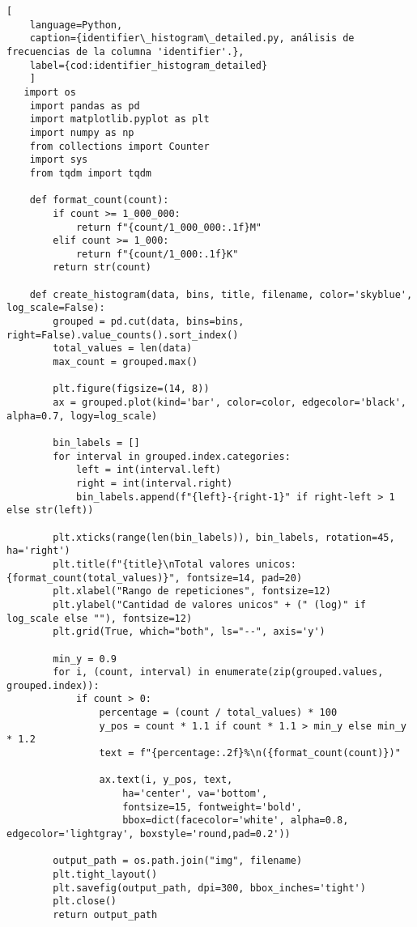 \begin{lstlisting}[
    language=Python,
    caption={identifier\_histogram\_detailed.py, análisis de frecuencias de la columna 'identifier'.},
    label={cod:identifier_histogram_detailed}
    ]
   import os
    import pandas as pd
    import matplotlib.pyplot as plt
    import numpy as np
    from collections import Counter
    import sys
    from tqdm import tqdm

    def format_count(count):
        if count >= 1_000_000:
            return f"{count/1_000_000:.1f}M"
        elif count >= 1_000:
            return f"{count/1_000:.1f}K"
        return str(count)

    def create_histogram(data, bins, title, filename, color='skyblue', log_scale=False):
        grouped = pd.cut(data, bins=bins, right=False).value_counts().sort_index()
        total_values = len(data)
        max_count = grouped.max()
        
        plt.figure(figsize=(14, 8))
        ax = grouped.plot(kind='bar', color=color, edgecolor='black', alpha=0.7, logy=log_scale)
        
        bin_labels = []
        for interval in grouped.index.categories:
            left = int(interval.left)
            right = int(interval.right)
            bin_labels.append(f"{left}-{right-1}" if right-left > 1 else str(left))
        
        plt.xticks(range(len(bin_labels)), bin_labels, rotation=45, ha='right')
        plt.title(f"{title}\nTotal valores unicos: {format_count(total_values)}", fontsize=14, pad=20)
        plt.xlabel("Rango de repeticiones", fontsize=12)
        plt.ylabel("Cantidad de valores unicos" + (" (log)" if log_scale else ""), fontsize=12)
        plt.grid(True, which="both", ls="--", axis='y')
        
        min_y = 0.9
        for i, (count, interval) in enumerate(zip(grouped.values, grouped.index)):
            if count > 0:
                percentage = (count / total_values) * 100
                y_pos = count * 1.1 if count * 1.1 > min_y else min_y * 1.2
                text = f"{percentage:.2f}%\n({format_count(count)})"
                
                ax.text(i, y_pos, text, 
                    ha='center', va='bottom', 
                    fontsize=15, fontweight='bold',
                    bbox=dict(facecolor='white', alpha=0.8, edgecolor='lightgray', boxstyle='round,pad=0.2'))
        
        output_path = os.path.join("img", filename)
        plt.tight_layout()
        plt.savefig(output_path, dpi=300, bbox_inches='tight')
        plt.close()
        return output_path


\end{lstlisting}
